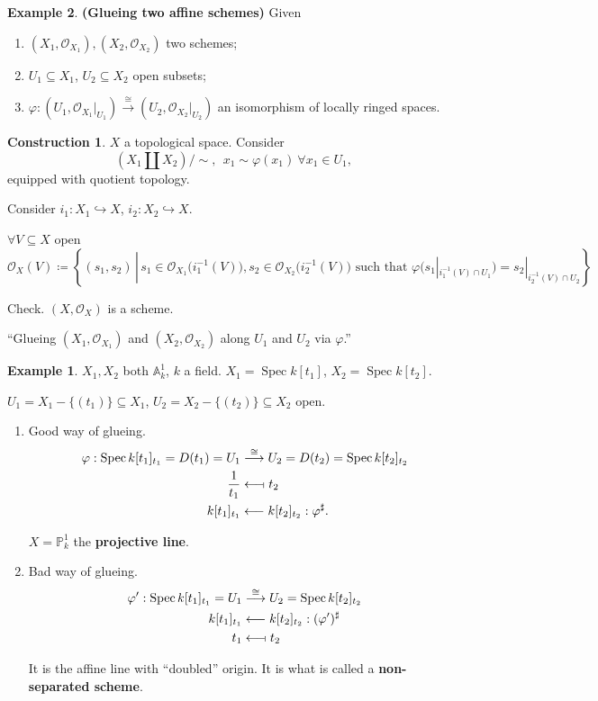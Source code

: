 \documentclass[12pt]{article}
\DeclareMathOperator{\Spec}{Spec}
\theoremstyle{definition}
\newtheorem*{example}{Example}
\newtheorem*{construction}{Construction}
\begin{document}
\begin{example}
\textbf{(Glueing two affine schemes)} Given
\begin{enumerate}[label=\arabic*)]
\item $(X_1,\mathcal O_{X_1}),(X_2,\mathcal O_{X_2})$ two schemes;
\item $U_1\subseteq X_1$, $U_2\subseteq X_2$ open subsets;
\item $\varphi:(U_1,\mathcal O_{X_1}|_{U_1})\xrightarrow\cong(U_2,\mathcal O_{X_2}|_{U_2})$ an isomorphism of locally ringed spaces.
\end{enumerate}

\begin{construction}
$X$ a topological space. Consider
\[\left(X_1\coprod X_2\right)/\sim,\ \ x_1\sim\varphi(x_1)\ \forall x_1\in U_1,\]
equipped with quotient topology.

Consider $i_1:X_1\hookrightarrow X$, $i_2:X_2\hookrightarrow X$.

$\forall V\subseteq X$ open
\[\mathcal O_X(V)\coloneqq\left\{(s_1,s_2)\,\left|\,s_1\in\mathcal O_{X_1}\big(i_1^{-1}(V)\big),s_2\in\mathcal O_{X_2}\big(i_2^{-1}(V)\big)\text{ such that }\varphi\big(s_1|_{i_1^{-1}(V)\cap U_1}\big)=s_2|_{i_2^{-1}(V)\cap U_2}\right.\right\}\]

Check. $(X,\mathcal O_X)$ is a scheme.
\end{construction}

``Glueing $(X_1,\mathcal O_{X_1})$ and $(X_2,\mathcal O_{X_2})$ along $U_1$ and $U_2$ via $\varphi$.''

\begin{example}
$X_1,X_2$ both $\mathbb A_k^1$, $k$ a field. $X_1=\Spec k[t_1]$, $X_2=\Spec k[t_2]$.

$U_1=X_1-\{(t_1)\}\subseteq X_1$, $U_2=X_2-\{(t_2)\}\subseteq X_2$ open.

\begin{enumerate}[label=\alph*)]
\item Good way of glueing.
\begin{align*}
\varphi:\Spec k[t_1]_{t_1}=D(t_1)=U_1&\overset\cong\longrightarrow U_2=D(t_2)=\Spec k[t_2]_{t_2}\\\frac1{t_1}&\longleftarrow\!\shortmid t_2\\k[t_1]_{t_1}&\longleftarrow k[t_2]_{t_2}:\varphi^\sharp.
\end{align*}

$X=\mathbb P_k^1$ the \textbf{projective line}.

\item Bad way of glueing.
\begin{align*}
\varphi':\Spec k[t_1]_{t_1}=U_1&\overset\cong\longrightarrow U_2=\Spec k[t_2]_{t_2}\\k[t_1]_{t_1}&\longleftarrow k[t_2]_{t_2}:(\varphi')^\sharp\\t_1&\longleftarrow\!\shortmid t_2
\end{align*}

It is the affine line with ``doubled'' origin. It is what is called a \textbf{non-separated scheme}.
\end{enumerate}
\end{example}
\end{example}
\end{document}
